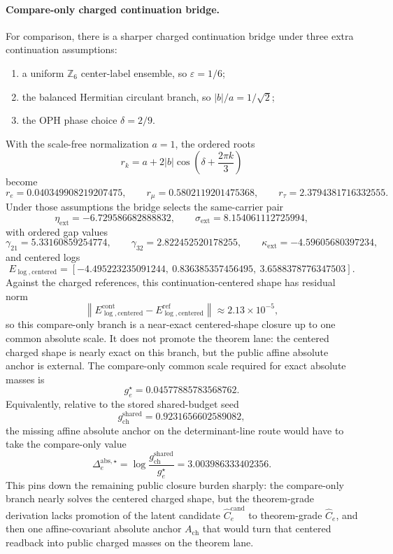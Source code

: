 \documentclass[11pt]{article}
\begin{document}
\paragraph{Compare-only charged continuation bridge.}
For comparison, there is a sharper charged continuation bridge under three extra continuation
assumptions:
\begin{enumerate}[leftmargin=2em]
\item a uniform \(\mathbb Z_6\) center-label ensemble, so \(\varepsilon = 1/6\);
\item the balanced Hermitian circulant branch, so \(|b|/a = 1/\sqrt2\);
\item the OPH phase choice \(\delta = 2/9\).
\end{enumerate}
With the scale-free normalization \(a=1\), the ordered roots
\[
r_k = a + 2|b|\cos\!\left(\delta + \frac{2\pi k}{3}\right)
\]
become
\[
r_e = 0.040349908219207475,
\qquad
r_\mu = 0.5802119201475368,
\qquad
r_\tau = 2.3794381716332555.
\]
Under those assumptions the bridge selects the same-carrier pair
\[
\eta_{\mathrm{ext}} = -6.729586682888832,
\qquad
\sigma_{\mathrm{ext}} = 8.154061112725994,
\]
with ordered gap values
\[
\gamma_{21}=5.33160859254774,
\qquad
\gamma_{32}=2.822452520178255,
\qquad
\kappa_{\mathrm{ext}}=-4.59605680397234,
\]
and centered logs
\[
E_{\log,\mathrm{centered}}
=
[-4.495223235091244,\ 0.836385357456495,\ 3.6588378776347503].
\]
Against the charged references, this continuation-centered shape has residual norm
\[
\left\|E_{\log,\mathrm{centered}}^{\mathrm{cont}}
-E_{\log,\mathrm{centered}}^{\mathrm{ref}}\right\|
\approx
2.13\times10^{-5},
\]
so this compare-only branch is a near-exact centered-shape closure up to one common absolute
scale. It does not promote the theorem lane: the centered charged shape is nearly exact on this
branch, but the public affine absolute anchor is external. The compare-only common scale
required for exact absolute masses is
\[
g_e^\star = 0.04577885783568762.
\]
Equivalently, relative to the stored shared-budget seed
\[
g_{\mathrm{ch}}^{\mathrm{shared}} = 0.9231656602589082,
\]
the missing affine absolute anchor on the determinant-line route would have to take the compare-only value
\[
\Delta_e^{\mathrm{abs},\star}
=
\log\!\frac{g_{\mathrm{ch}}^{\mathrm{shared}}}{g_e^\star}
=
3.003986333402356.
\]
This pins down the remaining public closure burden sharply: the compare-only branch nearly solves
the centered charged shape, but the theorem-grade derivation lacks promotion of the latent
candidate \(\widehat C_e^{\mathrm{cand}}\) to theorem-grade \(\widehat C_e\), and then one
affine-covariant absolute anchor \(A_{\mathrm{ch}}\) that would turn that centered readback into
public charged masses on the theorem lane.
\end{document}
